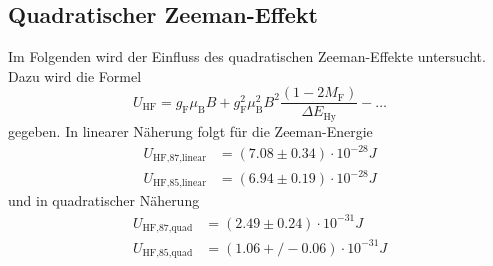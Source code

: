 \subsection{Quadratischer Zeeman-Effekt}
Im Folgenden wird der Einfluss des quadratischen Zeeman-Effekte untersucht. 
Dazu wird die Formel
\begin{equation}
  U_{\text{HF}}=g_{\text{F}}\mu_{\text{B}}B+g_{\text{F}}^2\mu_{\text{B}}^2B^2\frac{(1-2M_{\text{F}})}{\Delta E_{\text{Hy}}}-\ldots
  \label{eq:zeemanenergie}
\end{equation}
gegeben.
In linearer Näherung folgt für die Zeeman-Energie
\begin{align*}
  U_{\text{HF,87,linear}}&= (7.08\pm0.34)\cdot 10^{-28} J\\
  U_{\text{HF,85,linear}}&= (6.94\pm0.19)\cdot 10^{-28} J
\end{align*}
und in quadratischer Näherung
\begin{align*}
  U_{\text{HF,87,quad}}&= (2.49\pm0.24)\cdot 10^{-31} J\\
  U_{\text{HF,85,quad}}&= (1.06+/-0.06)\cdot 10^{-31} J
\end{align*}

